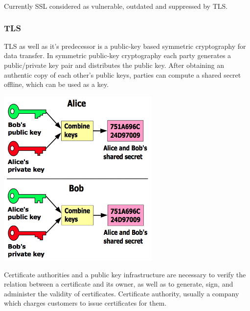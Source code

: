 \documentclass[thesis=M,english]{FITthesis}[2012/10/20]
\begin{document}
Currently SSL considered as vulnerable, outdated and suppressed by TLS.

\subsubsection{TLS}

TLS as well as it's predecessor is a public-key based symmetric cryptography for data transfer. In symmetric public-key cryptography each party generates a public/private key pair and distributes the public key. After obtaining an authentic copy of each other's public keys, parties can compute a shared secret offline, which can be used as a key.

\begin{center}
\includegraphics[width=0.6\textwidth]{images/symetric_chipher}
\end{center}

Certificate authorities and a public key infrastructure are necessary to verify the relation between a certificate and its owner, as well as to generate, sign, and administer the validity of certificates. Certificate authority, usually a company which charges customers to issue certificates for them.
\end{document}
